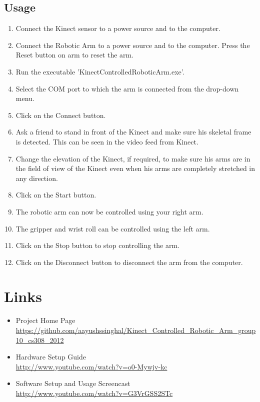 \documentclass[a4paper,11pt]{article}
\begin{document}
\subsection{Usage}
\begin{enumerate}
\item Connect the Kinect sensor to a power source and to the computer. 
\item Connect the Robotic Arm to a power source and to the computer. Press the Reset button on arm to reset the arm.
\item Run the executable 'KinectControlledRoboticArm.exe'.
\item Select the COM port to which the arm is connected from the drop-down menu.
\item Click on the Connect button.
\item Ask a friend to stand in front of the Kinect and make sure his skeletal frame is detected. This can be seen in the video feed from Kinect.
\item Change the elevation of the Kinect, if required, to make sure his arms are in the field of view of the Kinect even when his arms are completely stretched in any direction.
\item Click on the Start button.
\item The robotic arm can now be controlled using your right arm.
\item The gripper and wrist roll can be controlled using the left arm.
\item Click on the Stop button to stop controlling the arm.
\item Click on the Disconnect button to disconnect the arm from the computer.
\end{enumerate}

\section{Links}
\begin{itemize}
\item Project Home Page \\ \url{https://github.com/aayushssinghal/Kinect_Controlled_Robotic_Arm_group10_cs308_2012}
\item Hardware Setup Guide \\ \url{http://www.youtube.com/watch?v=o0-Mywjv-kc}
\item Software Setup and Usage Screencast\\ \url{http://www.youtube.com/watch?v=G3VrGSS2STc}
\end{itemize}
\end{document}
